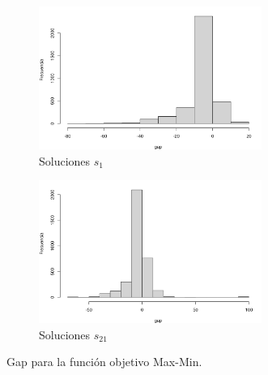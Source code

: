 \documentclass[preprint,12pt,authoryear]{elsarticle}
\begin{document}
\begin{figure}
	\centering
	\begin{subfigure}{\textwidth}
		\centering
		\includegraphics[width=0.8\textwidth]{hist_gap1.png}
		\caption{Soluciones $s_1$}
	\end{subfigure}
	\begin{subfigure}{\textwidth}
		\centering
		\includegraphics[width=0.8\textwidth]{hist_gap21.png}
		\caption{Soluciones $s_{21}$}
	\end{subfigure}
\caption{Gap para la función objetivo Max-Min.}
\label{histob1}
\end{figure}
\end{document}
